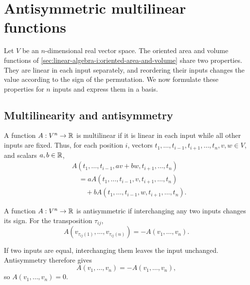 \section{Antisymmetric multilinear functions}
\label{sec:linear-algebra-i:antisymmetric-multilinear-functions}

Let \(V\) be an \(n\)-dimensional real vector space.
The oriented area and volume functions of
\autoref{sec:linear-algebra-i:oriented-area-and-volume} share two properties.
They are linear in each input separately, and reordering their inputs changes
the value according to the sign of the permutation. We now formulate these
properties for \(n\) inputs and express them in a basis.

\subsection{Multilinearity and antisymmetry}

\begin{definition}
  A function \(A:V^n\to\mathbb{R}\) is multilinear if it is linear in each input
  while all other inputs are fixed. Thus, for each position \(i\),
  vectors \(t_1,\ldots,t_{i-1},t_{i+1},\ldots,t_n,v,w\in V\), and
  scalars \(a,b\in\mathbb{R}\),
  \[
    \begin{aligned}
      &A(t_1,\ldots,t_{i-1},av+bw,t_{i+1},\ldots,t_n)\\
      &\quad=aA(t_1,\ldots,t_{i-1},v,t_{i+1},\ldots,t_n)\\
      &\qquad+bA(t_1,\ldots,t_{i-1},w,t_{i+1},\ldots,t_n).
    \end{aligned}
  \]
\end{definition}

\begin{definition}
  A function \(A:V^n\to\mathbb{R}\) is antisymmetric if interchanging any two
  inputs changes its sign. For the transposition \(\tau_{ij}\),
  \[
    A(v_{\tau_{ij}(1)},\ldots,v_{\tau_{ij}(n)})
      =-A(v_1,\ldots,v_n).
  \]
\end{definition}

If two inputs are equal, interchanging them leaves the input unchanged.
Antisymmetry therefore gives
\[
  A(v_1,\ldots,v_n)=-A(v_1,\ldots,v_n),
\]
so \(A(v_1,\ldots,v_n)=0\).

